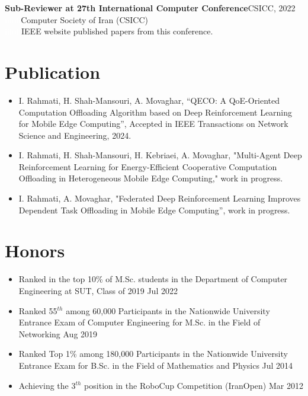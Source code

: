 \documentclass[11pt]{article}
\begin{document}
\hspace{-7mm}\textbf{Sub-Reviewer at 27th International Computer Conference}\hfill CSICC, 2022 \\
  \textcolor{white}{iiiiiii}Computer Society of Iran (CSICC) \href{http://csi.org.ir/csicc2022/index-2.html}{\small \faExternalLink}\\ \textcolor{white}{iiiiii} IEEE website published papers from this conference. \href{https://ieeexplore.ieee.org/xpl/conhome/9780464/proceeding}{\small \faExternalLink}
  
  
  \section {Publication}
  
  \begin{itemize}
  	
  	\item I. Rahmati, H. Shah-Mansouri, A. Movaghar, ``QECO: A QoE-Oriented Computation Offloading Algorithm based on Deep Reinforcement Learning for Mobile Edge Computing'', Accepted in IEEE Transactions on Network Science and Engineering, 2024.
  	\href{https://arxiv.org/pdf/2311.02525}{\small  \faExternalLink}
  	\href{https://github.com/ImanRHT/QECO}{\faGithub}
  	
  	
  	\item I. Rahmati, H. Shah-Mansouri, H. Kebriaei, A. Movaghar, "Multi-Agent Deep Reinforcement Learning for Energy-Efficient Cooperative Computation Offloading in Heterogeneous Mobile Edge Computing," work in progress.
  	
  	\item I. Rahmati, A. Movaghar, "Federated Deep Reinforcement Learning Improves Dependent Task Offloading in Mobile Edge Computing'', work in progress.
  	

  \end{itemize}

\section{Honors}
\begin{itemize}
	\renewcommand\labelitemi{\ding{118}}
	\item{Ranked in the top 10\% of M.Sc. students in the Department of Computer Engineering at SUT, Class of 2019  \hfill Jul 2022}\vspace{-2mm}
	\item {Ranked 55$^{th}$ among 60,000 Participants in the Nationwide University Entrance Exam of Computer Engineering for M.Sc. in the Field of Networking \hfill Aug 2019}\vspace{-2mm}
	\item{Ranked Top 1\% among 180,000 Participants in the Nationwide University Entrance Exam for B.Sc. in the Field of Mathematics and Physics  \hfill Jul 2014}\vspace{-2mm}
	\item{Achieving the 3$^{th}$ position in the RoboCup Competition (IranOpen)  \hfill Mar 2012}\vspace{-2mm}
\end{itemize}
\end{document}
